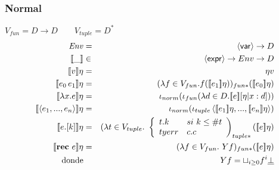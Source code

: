     \subsubsection{Normal}
      \PN $V_{fun} = D \rightarrow D \qquad V_{tuple} = D^{*}$
      \begin{eqnarray*}
        \Env &=& \var \to  D \\
        \llbracket\_\rrbracket &\in& \expr \to  Env \to  D \\
        \llbracket v \rrbracket\eta &=& \eta v \\
        \llbracket e_0\, e_1\rrbracket\eta &=& (\lambda f \in V_{fun}. f(\se{e_1}\eta))_{fun*} (\se{e_0}\eta) \\
        \llbracket\lambda x.e\rrbracket\eta &=& \iota_{norm}(\iota_{fun}(\lambda d \in D. \se{e}[\eta|x:d])) \\
        \se{\la e_1, ..., e_n \ra}\eta &=& \iota_{norm}(\iota_{tuple} \la \se{e_1}\eta, ..., \se{e_n}\eta \ra) \\
        \se{e.[k]}\eta &=& (\lambda t \in V_{tuple}. \ \left\lbrace 
        \begin{array}{lll}
          t.k & si \ k \leq \# t \\
          tyerr & c.c \\
        \end{array}\right)_{tuple*} (\se{e}\eta) \\
        \se{\textbf{rec}\  e} \eta &=& (\lambda f \in  V_{fun}.\ Y f)_{fun*} (\se{e}\eta ) \\
        \text{donde} && Y f = \sqcup_{i \geq 0} f^{i} \underline{\bot}
      \end{eqnarray*}
        
